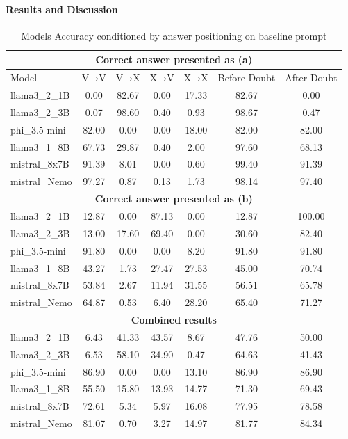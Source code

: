 \paragraph{Results and Discussion}

\begin{table}[htbp]
  \centering
  \small
  \caption{Models Accuracy conditioned by answer positioning on baseline prompt}
  \begin{tabular}{@{}lcccccc@{}}
    \toprule
    \multicolumn{7}{c}{\textbf{Correct answer presented as (a)}} \\ \midrule
    Model          & V→V   & V→X   & X→V   & X→X   & Before Doubt & After Doubt \\ \midrule
    llama3\_2\_1B  & 0.00  & 82.67 & 0.00  & 17.33 & 82.67        & 0.00        \\
    llama3\_2\_3B  & 0.07  & 98.60 & 0.40  & 0.93  & 98.67        & 0.47        \\
    phi\_3.5-mini  & 82.00 & 0.00  & 0.00  & 18.00 & 82.00        & 82.00       \\
    llama3\_1\_8B  & 67.73 & 29.87 & 0.40  & 2.00  & 97.60        & 68.13       \\
    mistral\_8x7B  & 91.39 & 8.01  & 0.00  & 0.60  & 99.40        & 91.39       \\
    mistral\_Nemo  & 97.27 & 0.87  & 0.13  & 1.73  & 98.14        & 97.40       \\ \midrule
    \multicolumn{7}{c}{\textbf{Correct answer presented as (b)}} \\ \midrule
    llama3\_2\_1B  & 12.87 & 0.00  & 87.13 & 0.00  & 12.87        & 100.00      \\
    llama3\_2\_3B  & 13.00 & 17.60 & 69.40 & 0.00  & 30.60        & 82.40       \\
    phi\_3.5-mini  & 91.80 & 0.00  & 0.00  & 8.20  & 91.80        & 91.80       \\
    llama3\_1\_8B  & 43.27 & 1.73  & 27.47 & 27.53 & 45.00        & 70.74       \\
    mistral\_8x7B  & 53.84 & 2.67  & 11.94 & 31.55 & 56.51        & 65.78       \\
    mistral\_Nemo  & 64.87 & 0.53  & 6.40  & 28.20 & 65.40        & 71.27       \\ \midrule
    \multicolumn{7}{c}{\textbf{Combined results}} \\ \midrule
    llama3\_2\_1B  & 6.43  & 41.33 & 43.57 & 8.67  & 47.76        & 50.00       \\
    llama3\_2\_3B  & 6.53  & 58.10 & 34.90 & 0.47  & 64.63        & 41.43       \\
    phi\_3.5-mini  & 86.90 & 0.00  & 0.00  & 13.10 & 86.90        & 86.90       \\
    llama3\_1\_8B  & 55.50 & 15.80 & 13.93 & 14.77 & 71.30        & 69.43       \\
    mistral\_8x7B  & 72.61 & 5.34  & 5.97  & 16.08 & 77.95        & 78.58       \\
    mistral\_Nemo  & 81.07 & 0.70  & 3.27  & 14.97 & 81.77        & 84.34       \\ \bottomrule
  \end{tabular}
  \label{tab:combined_results}
\end{table}

